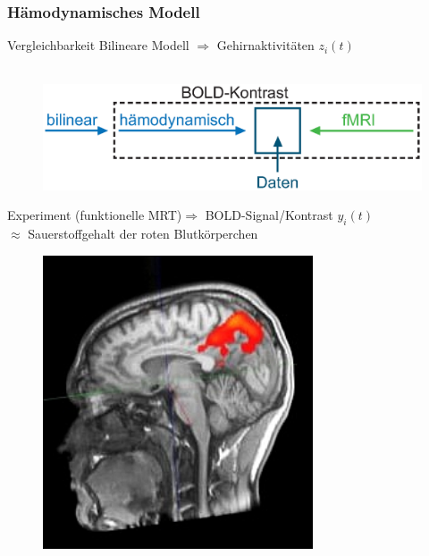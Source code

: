 \documentclass{beamer}
\begin{document}
\subsubsection{Hämodynamisches Modell}
\begin{frame}{Vergleichbarkeit}
Bilineare Modell $\Rightarrow$ Gehirnaktivitäten $z_i(t)$\\~\\
\begin{figure}
	{\includegraphics[width=0.8\linewidth]{res/Modelluebersicht_klein.eps}}
\end{figure}
\pause
Experiment (funktionelle MRT)$\Rightarrow$ BOLD-Signal/Kontrast $y_i(t)$\\
\hspace{3cm} $\approx$ Sauerstoffgehalt der roten Blutkörperchen 
\begin{figure}
{\includegraphics[width=8cm]{res/bold_signal.jpg}}
\end{figure}
\end{frame}
\end{document}
